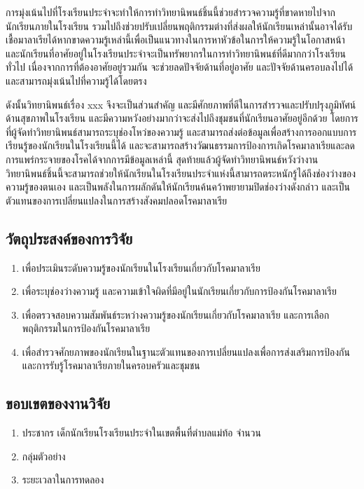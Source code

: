 \documentclass[12pt,twoside]{report}
\begin{document}
การมุ่งเน้นไปที่โรงเรียนประจำจะทำให้การทำวิทยานิพนธ์ชิ้นนี้ช่วยสำรวจความรู้ที่ขาดหายไปจากนักเรียนภายในโรงเรียน รวมไปถึงช่วยปรับเปลี่ยนพฤติกรรมต่างที่ส่งผลให้นักเรียนเหล่านั้นอาจได้รับเชื้อมาลาเรียได้หากขาดความรู้เหล่านี้เพื่อเป็นแนวทางในการหาหัวข้อในการให้ความรู้ในโอกาสหน้า และนักเรียนที่อาศัยอยู่ในโรงเรียนประจำจะเป็นทรัพยากรในการทำวิทยานิพนธ์ที่ดีมากกว่าโรงเรียนทั่วไป เนื่องจากการที่ต้องอาศัยอยู่รวมกัน จะช่วยลดปัจจัยด้านที่อยู่อาศัย และปัจจัยด้านครอบลงไปได้ และสามารถมุ่งเน้นไปที่ความรู้ได้โดยตรง

ดังนั้นวิทยานิพนธ์เรื่อง xxx จึงจะเป็นส่วนสำคัญ และมีศักยภาพที่ดีในการสำรวจและปรับปรุงภูมิทัศน์ด้านสุขภาพในโรงเรียน และมีความหวังอย่างมากว่าจะส่งไปถึงชุมชนที่นักเรียนอาศัยอยู่อีกด้วย โดยการที่ผู้จัดทำวิทยานิพนธ์สามารถระบุช่องโหว่ของความรู้ และสามารถส่งต่อข้อมูลเพื่อสร้างการออกแบบการเรียนรู้ของนักเรียนในโรงเรียนนี้ได้ และจะสามารถสร้างวัฒนธรรมการป้องการเกิดโรคมาลาเรียและลดการแพร่กระจายของโรคได้จากการมีข้อมูลเหล่านี้ สุดท้ายแล้วผู้จัดทำวิทยานิพนธ์หวังว่างานวิทยานิพนธ์ชิ้นนี้จะสามารถช่วยให้นักเรียนในโรงเรียนประจำแห่งนี้สามารถตระหนักรู้ได้ถึงช่องว่างของความรู้ของตนเอง และเป็นพลังในการผลักดันให้นักเรียนค้นคว้าพยายามปิดช่องว่างดังกล่าว และเป็นตัวแทนของการเปลี่ยนแปลงในการสร้างสังคมปลอดโรคมาลาเรีย

\subsection{วัตถุประสงค์ของการวิจัย}
\begin{enumerate}
    \item เพื่อประเมินระดับความรู้ของนักเรียนในโรงเรียนเกี่ยวกับโรคมาลาเรีย
    \item เพื่อระบุช่องว่างความรู้ และความเข้าใจผิดที่มีอยู่ในนักเรียนเกี่ยวกับการป้องกันโรคมาลาเรีย
    \item เพื่อตรวจสอบความสัมพันธ์ระหว่างความรู้ของนักเรียนเกี่ยวกับโรคมาลาเรีย และการเลือกพฤติกรรมในการป้องกันโรคมาลาเรีย
    \item เพื่อสำรวจศักยภาพของนักเรียนในฐานะตัวแทนของการเปลี่ยนแปลงเพื่อการส่งเสริมการป้องกันและการรับรู้โรคมาลาเรียภายในครอบครัวและชุมชน
\end{enumerate}

\subsection{ขอบเขตของงานวิจัย}
\begin{enumerate}
    \item ประชากร
          เด็กนักเรียนโรงเรียนประจำในเขตพื้นที่ตำบลแม่ท้อ จำนวน
    \item กลุ่มตัวอย่าง
    \item ระยะเวลาในการทดลอง
\end{enumerate}
\end{document}
